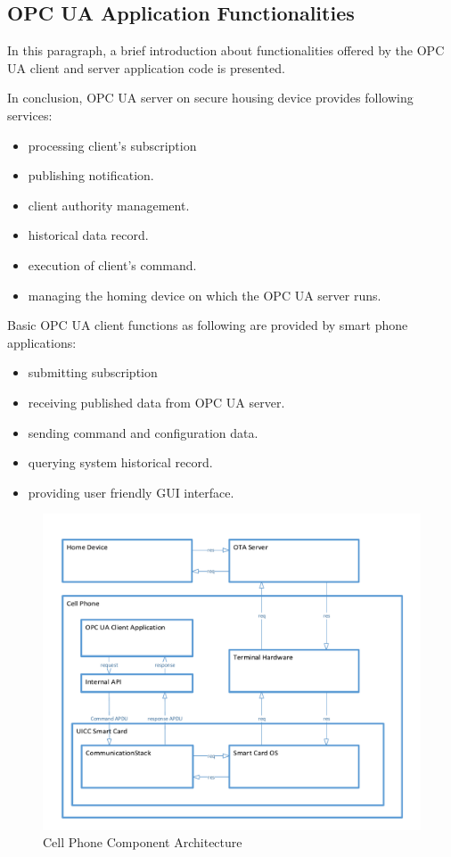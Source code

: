 \subsection{OPC UA Application Functionalities}\label{secFunction}
In this paragraph, a brief introduction about functionalities offered by  the OPC UA  client and server application code is presented.

In conclusion, OPC UA server on secure housing device provides following services:
 \begin{itemize}
  \item processing client's subscription
  \item publishing notification.
  \item client authority management.
  \item historical data record.
  \item execution of client's command.
  \item managing the homing device on which the OPC UA server runs.
\end{itemize}
Basic OPC UA client functions as following are provided by smart phone applications:
 \begin{itemize}
  \item submitting subscription
  \item receiving published data from OPC UA server.
  \item sending command and configuration data.
  \item querying system historical record.
  \item providing user friendly GUI interface.
\end{itemize}


 \begin{figure}[!htb]
	\centering
	\includegraphics[width=1\textwidth]{clientStructure}
		\caption{Cell Phone Component Architecture}
	\label{fig:clientStructure}
\end{figure}

